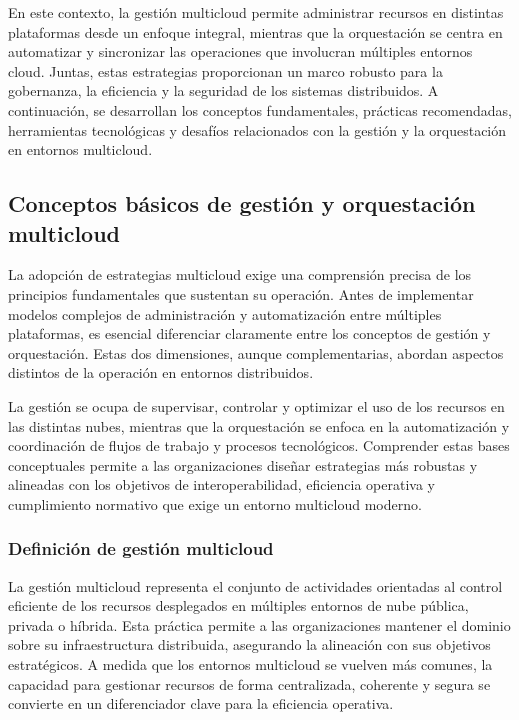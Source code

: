 {        En este contexto, la gestión multicloud permite administrar recursos en distintas plataformas desde un enfoque integral, mientras que la orquestación se centra en automatizar y sincronizar las operaciones que involucran múltiples entornos cloud. Juntas, estas estrategias proporcionan un marco robusto para la gobernanza, la eficiencia y la seguridad de los sistemas distribuidos. A continuación, se desarrollan los conceptos fundamentales, prácticas recomendadas, herramientas tecnológicas y desafíos relacionados con la gestión y la orquestación en entornos multicloud.
            
        \subsection{Conceptos básicos de gestión y orquestación multicloud}
            La adopción de estrategias multicloud exige una comprensión precisa de los principios fundamentales que sustentan su operación. Antes de implementar modelos complejos de administración y automatización entre múltiples plataformas, es esencial diferenciar claramente entre los conceptos de gestión y orquestación. Estas dos dimensiones, aunque complementarias, abordan aspectos distintos de la operación en entornos distribuidos.
            
            La gestión se ocupa de supervisar, controlar y optimizar el uso de los recursos en las distintas nubes, mientras que la orquestación se enfoca en la automatización y coordinación de flujos de trabajo y procesos tecnológicos. Comprender estas bases conceptuales permite a las organizaciones diseñar estrategias más robustas y alineadas con los objetivos de interoperabilidad, eficiencia operativa y cumplimiento normativo que exige un entorno multicloud moderno.
    
            \subsubsection{Definición de gestión multicloud}
                La gestión multicloud representa el conjunto de actividades orientadas al control eficiente de los recursos desplegados en múltiples entornos de nube pública, privada o híbrida. Esta práctica permite a las organizaciones mantener el dominio sobre su infraestructura distribuida, asegurando la alineación con sus objetivos estratégicos. A medida que los entornos multicloud se vuelven más comunes, la capacidad para gestionar recursos de forma centralizada, coherente y segura se convierte en un diferenciador clave para la eficiencia operativa.

}
